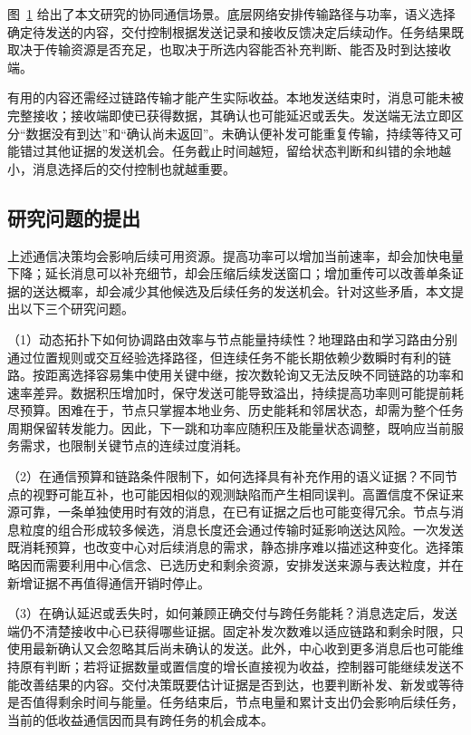 \begin{figure}[htbp]
\centering

\label{fig:intro:scenario}
\end{figure}

图~\ref{fig:intro:scenario} 给出了本文研究的协同通信场景。底层网络安排传输路径与功率，语义选择确定待发送的内容，交付控制根据发送记录和接收反馈决定后续动作。任务结果既取决于传输资源是否充足，也取决于所选内容能否补充判断、能否及时到达接收端。

有用的内容还需经过链路传输才能产生实际收益。本地发送结束时，消息可能未被完整接收；接收端即使已获得数据，其确认也可能延迟或丢失。发送端无法立即区分“数据没有到达”和“确认尚未返回”。未确认便补发可能重复传输，持续等待又可能错过其他证据的发送机会。任务截止时间越短，留给状态判断和纠错的余地越小，消息选择后的交付控制也就越重要。

\subsection{研究问题的提出}

上述通信决策均会影响后续可用资源。提高功率可以增加当前速率，却会加快电量下降；延长消息可以补充细节，却会压缩后续发送窗口；增加重传可以改善单条证据的送达概率，却会减少其他候选及后续任务的发送机会。针对这些矛盾，本文提出以下三个研究问题。

（1）动态拓扑下如何协调路由效率与节点能量持续性？地理路由和学习路由分别通过位置规则或交互经验选择路径\cite{gpsr,drlfr,drlrr}，但连续任务不能长期依赖少数瞬时有利的链路。按距离选择容易集中使用关键中继，按次数轮询又无法反映不同链路的功率和速率差异。数据积压增加时，保守发送可能导致溢出，持续提高功率则可能提前耗尽预算。困难在于，节点只掌握本地业务、历史能耗和邻居状态，却需为整个任务周期保留转发能力。因此，下一跳和功率应随积压及能量状态调整，既响应当前服务需求，也限制关键节点的连续过度消耗。

（2）在通信预算和链路条件限制下，如何选择具有补充作用的语义证据？不同节点的视野可能互补，也可能因相似的观测缺陷而产生相同误判。高置信度不保证来源可靠，一条单独使用时有效的消息，在已有证据之后也可能变得冗余。节点与消息粒度的组合形成较多候选，消息长度还会通过传输时延影响送达风险。一次发送既消耗预算，也改变中心对后续消息的需求，静态排序难以描述这种变化。选择策略因而需要利用中心信念、已选历史和剩余资源，安排发送来源与表达粒度，并在新增证据不再值得通信开销时停止。

（3）在确认延迟或丢失时，如何兼顾正确交付与跨任务能耗？消息选定后，发送端仍不清楚接收中心已获得哪些证据。固定补发次数难以适应链路和剩余时限，只使用最新确认又会忽略其后尚未确认的发送。此外，中心收到更多消息后也可能维持原有判断；若将证据数量或置信度的增长直接视为收益，控制器可能继续发送不能改善结果的内容。交付决策既要估计证据是否到达，也要判断补发、新发或等待是否值得剩余时间与能量。任务结束后，节点电量和累计支出仍会影响后续任务，当前的低收益通信因而具有跨任务的机会成本。

